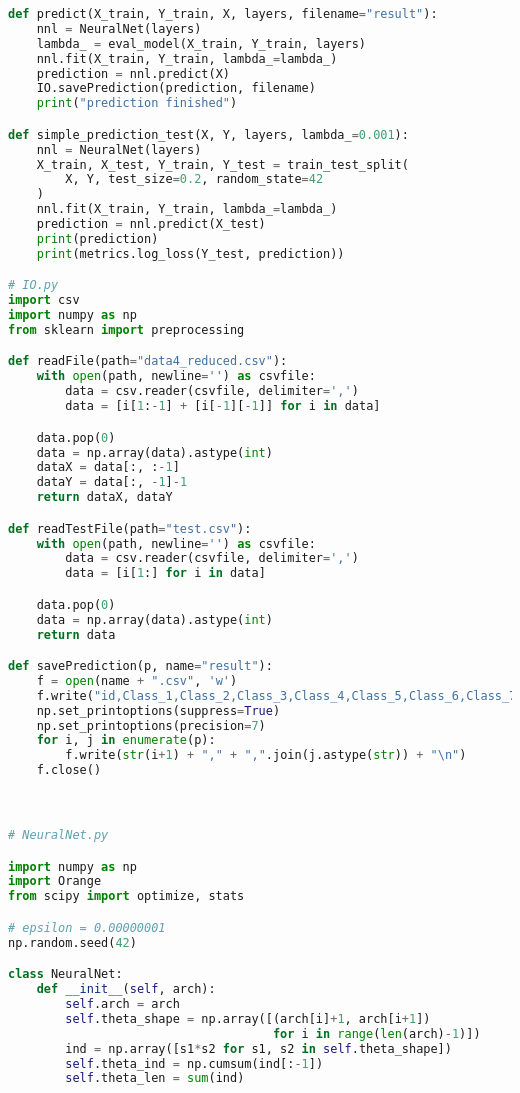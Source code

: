 \documentclass[a4paper,11pt]{article}
\begin{document}
\begin{lstlisting}[language=Python]
def predict(X_train, Y_train, X, layers, filename="result"):
    nnl = NeuralNet(layers)
    lambda_ = eval_model(X_train, Y_train, layers)
    nnl.fit(X_train, Y_train, lambda_=lambda_)
    prediction = nnl.predict(X)
    IO.savePrediction(prediction, filename)
    print("prediction finished")

def simple_prediction_test(X, Y, layers, lambda_=0.001):
    nnl = NeuralNet(layers)
    X_train, X_test, Y_train, Y_test = train_test_split(
        X, Y, test_size=0.2, random_state=42
    )
    nnl.fit(X_train, Y_train, lambda_=lambda_)
    prediction = nnl.predict(X_test)
    print(prediction)
    print(metrics.log_loss(Y_test, prediction))

# IO.py
import csv
import numpy as np
from sklearn import preprocessing

def readFile(path="data4_reduced.csv"):
    with open(path, newline='') as csvfile:
        data = csv.reader(csvfile, delimiter=',')
        data = [i[1:-1] + [i[-1][-1]] for i in data]

    data.pop(0)
    data = np.array(data).astype(int)
    dataX = data[:, :-1]
    dataY = data[:, -1]-1
    return dataX, dataY

def readTestFile(path="test.csv"):
    with open(path, newline='') as csvfile:
        data = csv.reader(csvfile, delimiter=',')
        data = [i[1:] for i in data]

    data.pop(0)
    data = np.array(data).astype(int)
    return data

def savePrediction(p, name="result"):
    f = open(name + ".csv", 'w')
    f.write("id,Class_1,Class_2,Class_3,Class_4,Class_5,Class_6,Class_7,Class_8,Class_9\n")
    np.set_printoptions(suppress=True)
    np.set_printoptions(precision=7)
    for i, j in enumerate(p):
        f.write(str(i+1) + "," + ",".join(j.astype(str)) + "\n")
    f.close()



# NeuralNet.py

import numpy as np
import Orange
from scipy import optimize, stats

# epsilon = 0.00000001
np.random.seed(42)

class NeuralNet:
    def __init__(self, arch):
        self.arch = arch
        self.theta_shape = np.array([(arch[i]+1, arch[i+1])
                                     for i in range(len(arch)-1)])
        ind = np.array([s1*s2 for s1, s2 in self.theta_shape])
        self.theta_ind = np.cumsum(ind[:-1])
        self.theta_len = sum(ind)


\end{lstlisting}
\end{document}
